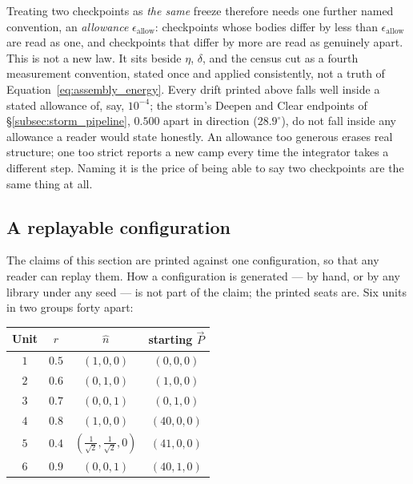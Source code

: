 \documentclass[12pt, a4paper]{article}
\begin{document}
Treating two checkpoints as \emph{the same} freeze therefore
needs one further named convention, an \emph{allowance}
$\epsilon_{\text{allow}}$: checkpoints whose bodies differ by less
than $\epsilon_{\text{allow}}$ are read as one, and checkpoints that
differ by more are read as genuinely apart. This is not a new law.
It sits beside $\eta$, $\delta$, and the census cut as a fourth
measurement convention, stated once and applied consistently, not a
truth of Equation~\eqref{eq:assembly_energy}. Every drift printed
above falls well inside a stated allowance of, say, $10^{-4}$; the
storm's Deepen and Clear endpoints of \S\ref{subsec:storm_pipeline},
$0.500$ apart in direction ($28.9^\circ$), do not fall inside any
allowance a reader would state honestly. An allowance too generous
erases real structure; one too strict reports a new camp
every time the integrator takes a different step. Naming it is the
price of being able to say two checkpoints are the same thing at
all.

\subsection{A replayable configuration}
\label{subsec:enclosure_replay}
The claims of this section are printed against one configuration, so
that any reader can replay them. How a configuration is generated ---
by hand, or by any library under any seed --- is not part of the
claim; the printed seats are. Six units in two groups forty apart:

\begin{center}
\begin{tabular}{cccc}
Unit & $r$ & $\hat n$ & starting $\vec P$ \\
\hline
$1$ & $0.5$ & $(1,0,0)$ & $(0,0,0)$ \\
$2$ & $0.6$ & $(0,1,0)$ & $(1,0,0)$ \\
$3$ & $0.7$ & $(0,0,1)$ & $(0,1,0)$ \\
$4$ & $0.8$ & $(1,0,0)$ & $(40,0,0)$ \\
$5$ & $0.4$ & $(\tfrac{1}{\sqrt2},\tfrac{1}{\sqrt2},0)$ & $(41,0,0)$ \\
$6$ & $0.9$ & $(0,0,1)$ & $(40,1,0)$ \\
\end{tabular}
\end{center}
\end{document}
